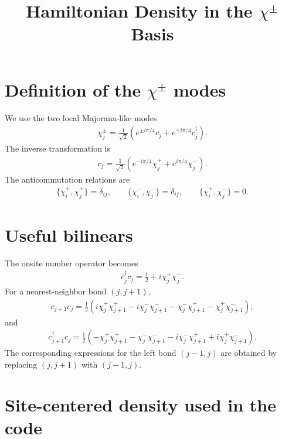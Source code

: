 \documentclass[11pt,a4paper]{article}
\title{Hamiltonian Density in the $\chi^\pm$ Basis}
\author{}
\date{}
\begin{document}
\maketitle

\section{Definition of the $\chi^\pm$ modes}

We use the two local Majorana-like modes
\begin{align}
  \chi_j^\pm
  =
  \frac{1}{\sqrt{2}}
  \left(
    e^{\pm i\pi/4}c_j
    +
    e^{\mp i\pi/4}c_j^\dagger
  \right).
\end{align}
The inverse transformation is
\begin{align}
  c_j
  =
  \frac{1}{\sqrt{2}}
  \left(
    e^{-i\pi/4}\chi_j^+
    +
    e^{i\pi/4}\chi_j^-
  \right).
\end{align}
The anticommutation relations are
\begin{align}
  \{\chi_i^+,\chi_j^+\}=\delta_{ij},
  \qquad
  \{\chi_i^-,\chi_j^-\}=\delta_{ij},
  \qquad
  \{\chi_i^+,\chi_j^-\}=0.
\end{align}

\section{Useful bilinears}

The onsite number operator becomes
\begin{align}
  c_j^\dagger c_j
  =
  \frac{1}{2}
  +
  i\chi_j^+\chi_j^- .
\end{align}
For a nearest-neighbor bond $(j,j+1)$,
\begin{align}
  c_{j+1}c_j
  =
  \frac{1}{2}
  \left(
    i\chi_j^+\chi_{j+1}^+
    -
    i\chi_j^-\chi_{j+1}^-
    -
    \chi_j^-\chi_{j+1}^+
    -
    \chi_j^+\chi_{j+1}^-
  \right),
\end{align}
and
\begin{align}
  c_{j+1}^\dagger c_j
  =
  \frac{1}{2}
  \left(
    -\chi_j^+\chi_{j+1}^+
    -
    \chi_j^-\chi_{j+1}^-
    -
    i\chi_j^-\chi_{j+1}^+
    +
    i\chi_j^+\chi_{j+1}^-
  \right).
\end{align}
The corresponding expressions for the left bond $(j-1,j)$ are obtained by
replacing $(j,j+1)$ with $(j-1,j)$.

\section{Site-centered density used in the code}
\end{document}

